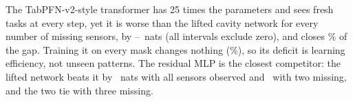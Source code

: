 The TabPFN-v2-style transformer has 25 times the parameters and sees fresh tasks at every step, yet it is worse than
the lifted cavity network for every number of missing sensors, by \MainkKZeroliftvspfnabs--\MainkKTwoliftvspfnabs\
nats (all intervals exclude zero), and closes \Gappfn\% of the gap. Training it on every mask changes nothing
(\Gappfnall\%), so its deficit is learning efficiency, not unseen patterns. The residual MLP is the closest
competitor: the lifted network beats it by \MainkKZeroliftvsmlpabs\ nats with all sensors observed and
\MainkKTwoliftvsmlpabs\ with two missing, and the two tie with three missing.
